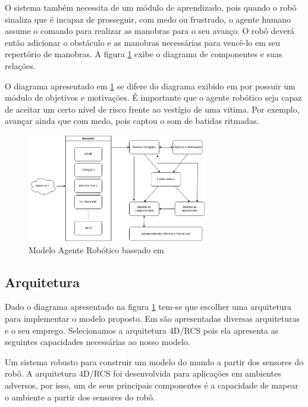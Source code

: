 \documentclass[
	article,			%
	11pt,				%
	oneside,			%
	a4paper,			%
	english,			%
	brazil,				%
	sumario=tradicional	
	]{abntex2}
\begin{document}
O sistema também necessita de um módulo de aprendizado, pois quando o robô sinaliza que é incapaz de prosseguir, com medo ou frustrado, o agente humano assume o comando para realizar as manobras para o seu avanço. O robô deverá então adicionar o obstáculo e as manobras necessárias para vencê-lo em seu repertório de manobras. A figura \ref{figure:componentes} exibe o diagrama de componentes e suas relações.

O diagrama apresentado em \ref{figure:componentes} se difere do diagrama exibido em  \cite{kim2002implementation} por possuir um módulo de objetivos e motivações. É importante que o agente robótico seja capaz de aceitar um certo nível de risco frente ao vestígio de uma vitima. Por exemplo, avançar ainda que com medo, pois captou o som de batidas ritmadas.


\begin{figure}
  \centering
  \includegraphics[width=0.7\textwidth]{modelo.png}
  \caption{Modelo Agente Robótico baseado em \cite{kim2002implementation}}
  \label{figure:componentes}
\end{figure}

\subsection{Arquitetura}

Dado o diagrama apresentado na figura \ref{figure:componentes} tem-se que escolher uma arquitetura para implementar o modelo proposto. Em \cite{kotseruba202040} são apresentadas diversas arquiteturas e o seu emprego. Selecionamos a arquitetura 4D/RCS pois ela apresenta as seguintes capacidades necessárias ao nosso modelo.

Um sistema robusto para construir um modelo do mundo a partir dos sensores do robô. A arquitetura 4D/RCS foi desenvolvida para aplicações em ambientes adversos, por isso, um de seus principais componentes é a capacidade de mapear o ambiente a partir dos sensores do robô.
\end{document}
